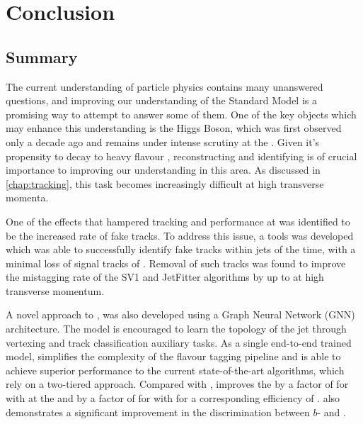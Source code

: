 \chapter{Conclusion}
\label{chap:conclusion}

\section{Summary}\label{sec:conc-summary}

The current understanding of particle physics contains many unanswered questions, and improving our understanding of the Standard Model is a promising way to attempt to answer some of them.
One of the key objects which may enhance this understanding is the Higgs Boson, which was first observed only a decade ago and remains under intense scrutiny at the \LHC.
Given it's propensity to decay to heavy flavour \bquarks, reconstructing and identifying \bjets is of crucial importance to improving our understanding in this area.
As discussed in \cref{chap:tracking}, this task becomes increasingly difficult at high transverse momenta.

One of the effects that hampered tracking and \btagging performance at \highpt was identified to be the increased rate of fake tracks.
To address this issue, a tools was developed which was able to successfully identify fake tracks within jets  of the time, with a minimal loss of signal tracks of .
Removal of such tracks was found to improve the \ljet mistagging rate of the SV1 and JetFitter algorithms by up to  at high transverse momentum.

A novel approach to \btagging, \GNN was also developed using a Graph Neural Network (GNN) architecture.
The model is encouraged to learn the topology of the jet through vertexing and track classification auxiliary tasks.
As a single end-to-end trained model, \GNN simplifies the complexity of the flavour tagging pipeline and is able to achieve superior performance to the current state-of-the-art algorithms, which rely on a two-tiered approach.
Compared with \DLr, \GNN improves the \lrej by a factor of \ttbllo for \ttbarjets with \ttbarpt at the  and by a factor of \zpbllo for \Zprimejets with \Zprimept for a corresponding \bjet efficiency of .
\GNN also demonstrates a significant improvement in the discrimination between $b$- and \cjets. 

